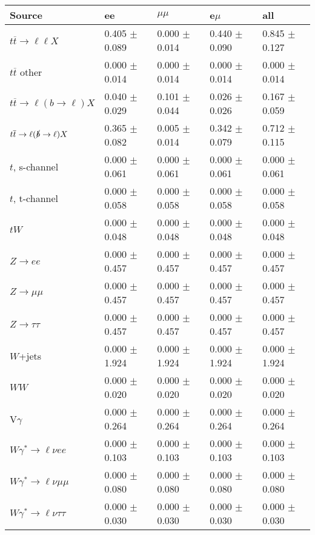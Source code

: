 \begin{tabular}{l | l l l l}
\hline\hline
 Source  &  ee  &  $\mu\mu$  &  e$\mu$  &  all \\
\hline
$t\overline{t}\rightarrow \ell\ell X$ &  0.405 $\pm$  0.089 &  0.000 $\pm$  0.014 &  0.440 $\pm$  0.090 &  0.845 $\pm$  0.127\\
$t\overline{t}$ other &  0.000 $\pm$  0.014 &  0.000 $\pm$  0.014 &  0.000 $\pm$  0.014 &  0.000 $\pm$  0.014\\
$t\overline{t}\rightarrow \ell(b\rightarrow \ell)X$ &  0.040 $\pm$  0.029 &  0.101 $\pm$  0.044 &  0.026 $\pm$  0.026 &  0.167 $\pm$  0.059\\
$t\overline{t}\rightarrow \ell(\slashed{b}\rightarrow \ell)X$ &  0.365 $\pm$  0.082 &  0.005 $\pm$  0.014 &  0.342 $\pm$  0.079 &  0.712 $\pm$  0.115\\
\hline
$t$, s-channel &  0.000 $\pm$  0.061 &  0.000 $\pm$  0.061 &  0.000 $\pm$  0.061 &  0.000 $\pm$  0.061\\
$t$, t-channel &  0.000 $\pm$  0.058 &  0.000 $\pm$  0.058 &  0.000 $\pm$  0.058 &  0.000 $\pm$  0.058\\
$tW$ &  0.000 $\pm$  0.048 &  0.000 $\pm$  0.048 &  0.000 $\pm$  0.048 &  0.000 $\pm$  0.048\\
\hline
$Z\rightarrow ee$ &  0.000 $\pm$  0.457 &  0.000 $\pm$  0.457 &  0.000 $\pm$  0.457 &  0.000 $\pm$  0.457\\
$Z\rightarrow\mu\mu$ &  0.000 $\pm$  0.457 &  0.000 $\pm$  0.457 &  0.000 $\pm$  0.457 &  0.000 $\pm$  0.457\\
$Z\rightarrow\tau\tau$ &  0.000 $\pm$  0.457 &  0.000 $\pm$  0.457 &  0.000 $\pm$  0.457 &  0.000 $\pm$  0.457\\
$W$+jets &  0.000 $\pm$  1.924 &  0.000 $\pm$  1.924 &  0.000 $\pm$  1.924 &  0.000 $\pm$  1.924\\
$WW$ &  0.000 $\pm$  0.020 &  0.000 $\pm$  0.020 &  0.000 $\pm$  0.020 &  0.000 $\pm$  0.020\\
\hline
V$\gamma$ &  0.000 $\pm$  0.264 &  0.000 $\pm$  0.264 &  0.000 $\pm$  0.264 &  0.000 $\pm$  0.264\\
$W\gamma^{*}\rightarrow\ell\nu e e$ &  0.000 $\pm$  0.103 &  0.000 $\pm$  0.103 &  0.000 $\pm$  0.103 &  0.000 $\pm$  0.103\\
$W\gamma^{*}\rightarrow\ell\nu\mu\mu$ &  0.000 $\pm$  0.080 &  0.000 $\pm$  0.080 &  0.000 $\pm$  0.080 &  0.000 $\pm$  0.080\\
$W\gamma^{*}\rightarrow\ell\nu\tau\tau$ &  0.000 $\pm$  0.030 &  0.000 $\pm$  0.030 &  0.000 $\pm$  0.030 &  0.000 $\pm$  0.030\\

\end{tabular}
